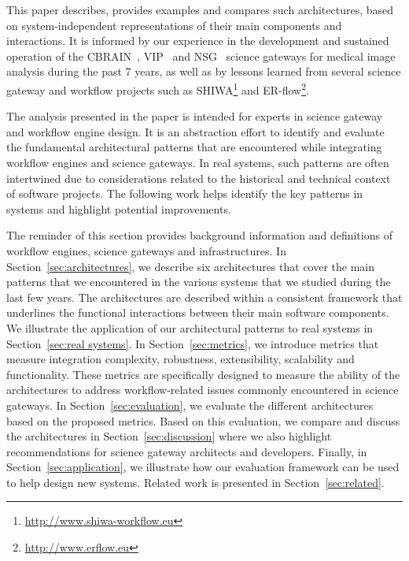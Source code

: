\documentclass[preprint,3p,twocolumn]{elsarticle}
\newcommand{\correction}[1]{\color{blue}#1\color{black}\xspace}
\begin{document}
This paper describes, provides examples and compares such
architectures, based on system-independent representations of their
main components and interactions. It is informed by our experience in
the development and sustained operation of the CBRAIN~\cite{SHER-14},
VIP~\cite{GLAT-13} and NSG~\cite{shahand2015data,shahand:2012jgc}
science gateways for medical image analysis during the past 7 years,
as well as by lessons learned from several science gateway and
workflow projects such as
SHIWA\footnote{\url{http://www.shiwa-workflow.eu}} and
ER-flow\footnote{\url{http://www.erflow.eu}}.

\correction{The analysis presented in the paper is intended for
experts in science gateway and workflow engine design. It is an
abstraction effort to identify and evaluate the fundamental
architectural patterns that are encountered while integrating workflow
engines and science gateways. In real systems, such patterns are often
intertwined due to considerations related to the historical and
technical context of software projects. The following work helps
identify the key patterns in systems and highlight potential
improvements.}

\correction{The reminder of this section provides} background
information and definitions of workflow engines, science gateways and
infrastructures. In Section~\ref{sec:architectures}, we describe six
architectures that cover the main patterns that we encountered in the
various systems that we studied during the last few years. The
architectures are described within a consistent framework that
underlines the functional interactions between their main software
components. \correction{We illustrate the application of our
  architectural patterns to real systems in Section~\ref{sec:real
    systems}. In Section~\ref{sec:metrics}, we introduce metrics that
  measure integration complexity, robustness, extensibility,
  scalability and \correction{functionality}. These metrics are
  specifically designed to measure the ability of the architectures to
  address workflow-related issues commonly encountered in science
  gateways. In Section~\ref{sec:evaluation}, we evaluate the different
  architectures based on the proposed metrics.} \correction{Based on
  this evaluation, we compare and discuss the architectures in
  Section~\ref{sec:discussion} where we also highlight}
recommendations for science gateway architects and
developers. \correction{Finally, in Section~\ref{sec:application}, we
  illustrate how our evaluation framework can be used to help design
  new systems. Related work is presented in Section~\ref{sec:related}.}
\end{document}
